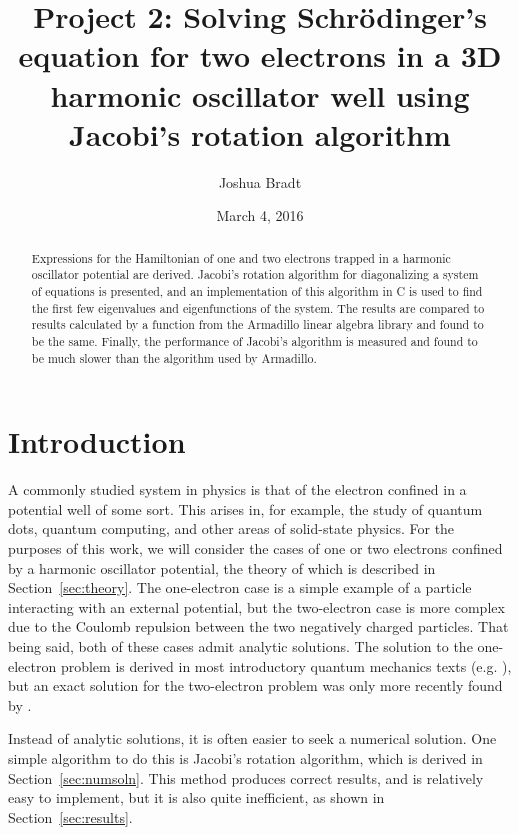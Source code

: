 \documentclass[aps,prc,reprint]{revtex4-1}
\begin{document}
\title{Project 2: Solving Schr\"odinger's equation for two electrons in a 3D harmonic oscillator well using Jacobi's rotation algorithm}
\author{Joshua Bradt}
\noaffiliation
\date{March 4, 2016}

\begin{abstract}
    Expressions for the Hamiltonian of one and two electrons trapped in a harmonic oscillator potential are derived. Jacobi's rotation algorithm for diagonalizing a system of equations is presented, and an implementation of this algorithm in C is used to find the first few eigenvalues and eigenfunctions of the system. The results are compared to results calculated by a function from the Armadillo linear algebra library \cite{Sanderson2010} and found to be the same. Finally, the performance of Jacobi's algorithm is measured and found to be much slower than the algorithm used by Armadillo.
\end{abstract}

\maketitle

\section{Introduction}
\label{sec:introduction}
    A commonly studied system in physics is that of the electron confined in a potential well of some sort. This arises in, for example, the study of quantum dots, quantum computing, and other areas of solid-state physics. \cite{courserepo} For the purposes of this work, we will consider the cases of one or two electrons confined by a harmonic oscillator potential, the theory of which is described in Section~\ref{sec:theory}. The one-electron case is a simple example of a particle interacting with an external potential, but the two-electron case is more complex due to the Coulomb repulsion between the two negatively charged particles. That being said, both of these cases admit analytic solutions. The solution to the one-electron problem is derived in most introductory quantum mechanics texts (e.g. \textcite[p. 351]{Shankar1994}), but an exact solution for the two-electron problem was only more recently found by \textcite{Taut1993}.

    Instead of analytic solutions, it is often easier to seek a numerical solution. One simple algorithm to do this is Jacobi's rotation algorithm, which is derived in Section~\ref{sec:numsoln}. This method produces correct results, and is relatively easy to implement, but it is also quite inefficient, as shown in Section~\ref{sec:results}.
\end{document}
